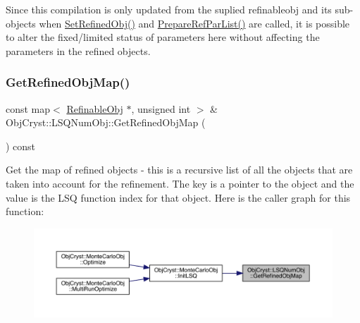Since this compilation is only updated from the suplied refinableobj and its sub-\/objects when \mbox{\hyperlink{class_obj_cryst_1_1_l_s_q_num_obj_ac093bab1bcb43aa4ea00f63fdb53063f}{Set\+Refined\+Obj()}} and \mbox{\hyperlink{class_obj_cryst_1_1_l_s_q_num_obj_afdeb58450a3e0506fc02a0b5df15a600}{Prepare\+Ref\+Par\+List()}} are called, it is possible to alter the fixed/limited status of parameters here without affecting the parameters in the refined objects. \mbox{\label{class_obj_cryst_1_1_l_s_q_num_obj_a67a9441f00f93e3ca73b1cab404bf565}} 
\subsubsection{\texorpdfstring{GetRefinedObjMap()}{GetRefinedObjMap()}\hspace{0.1cm}{\footnotesize\ttfamily [1/2]}}
{\footnotesize\ttfamily const map$<$ \mbox{\hyperlink{class_obj_cryst_1_1_refinable_obj}{Refinable\+Obj}} $\ast$, unsigned int $>$ \& Obj\+Cryst\+::\+L\+S\+Q\+Num\+Obj\+::\+Get\+Refined\+Obj\+Map (\begin{DoxyParamCaption}{ }\end{DoxyParamCaption}) const}

Get the map of refined objects -\/ this is a recursive list of all the objects that are taken into account for the refinement. The key is a pointer to the object and the value is the L\+SQ function index for that object. Here is the caller graph for this function\+:
\nopagebreak
\begin{figure}[H]
\begin{center}
\leavevmode
\includegraphics[width=350pt]{class_obj_cryst_1_1_l_s_q_num_obj_a67a9441f00f93e3ca73b1cab404bf565_icgraph}
\end{center}
\end{figure}
\mbox{\label{class_obj_cryst_1_1_l_s_q_num_obj_a8dcad64f6e47e1722ba6946f879cdaa4}} 
